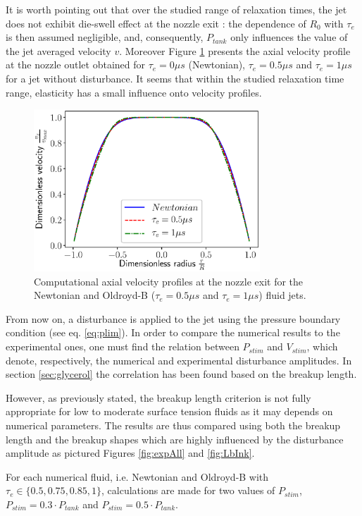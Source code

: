 \documentclass[twocolumn,10pt]{asme2ej}
\begin{document}
It is worth pointing out that over the studied range of relaxation times, the jet does not exhibit die-swell effect at the nozzle exit : the dependence of $R_0$ with $\tau_e$ is then assumed negligible, and, consequently, $P_{tank}$ only influences the value of the jet averaged velocity $v$. Moreover Figure \ref{fig:vProfiles} presents the axial velocity profile at the nozzle outlet obtained for $\tau_e = 0\mu s$ (Newtonian), $\tau_e = 0.5\mu s$ and $\tau_e = 1\mu s$ for a jet without disturbance. It seems that within the studied relaxation time range, elasticity has a small influence onto velocity profiles.

\begin{figure}[H]
    \centering
    \includegraphics[width=8.5cm]{rProfilesInk.eps}
    \caption{Computational axial velocity profiles at the nozzle exit for the Newtonian and Oldroyd-B ($\tau_e = 0.5\mu s$ and $\tau_e = 1\mu s$) fluid jets.}
    \label{fig:vProfiles}
\end{figure}

From now on, a disturbance is applied to the jet using the pressure boundary condition (see eq. \ref{eq:plim}). In order to compare the numerical results to the experimental ones, one must find the relation between $P_{stim}$ and $V_{stim}$, which denote, respectively, the numerical and experimental disturbance amplitudes. In section \ref{sec:glycerol} the correlation has been found based on the breakup length. 

However, as previously stated, the breakup length criterion is not fully appropriate for low to moderate surface tension fluids as it may depends on numerical parameters. The results are thus compared using both the breakup length and the breakup shapes which are highly influenced by the disturbance amplitude as pictured Figures \ref{fig:expAll} and \ref{fig:LbInk}. 

For each numerical fluid, i.e. Newtonian and Oldroyd-B with $\tau_e \in  \{0.5,0.75,0.85,1\}$, calculations are made for two values of $P_{stim}$, $P_{stim}= 0.3\cdot P_{tank}$ and $P_{stim}= 0.5\cdot P_{tank}$. 
\end{document}
